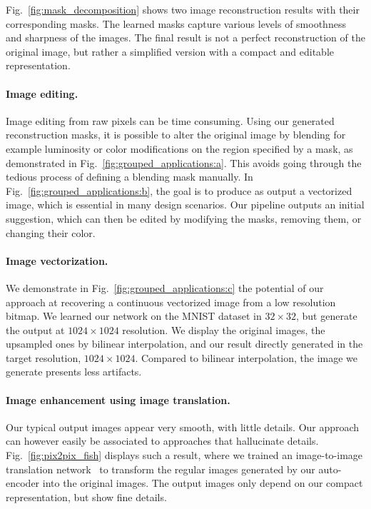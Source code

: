 \documentclass[10pt,twocolumn,letterpaper]{article}
\begin{document}
Fig.~\ref{fig:mask_decomposition} shows two image reconstruction results with their corresponding masks. The learned masks capture various levels of smoothness and sharpness of the images. The final result is not a perfect reconstruction of the original image, but rather a simplified version with a compact and editable representation.

\paragraph{Image editing.}{
Image editing from raw pixels can be time consuming. Using our generated reconstruction masks, it is possible to alter the original image by blending for example luminosity or color modifications on the region specified by a mask, as demonstrated in Fig.~\ref{fig:grouped_applications:a}. This avoids going through the tedious process of defining a blending mask manually.
In Fig.~\ref{fig:grouped_applications:b}, the goal is to produce as output a vectorized image, which is essential in many design scenarios. Our pipeline outputs an initial suggestion, which can then be edited by modifying the masks, removing them, or changing their color.
}

\paragraph{Image vectorization.}

We demonstrate in Fig.~\ref{fig:grouped_applications:c} the potential of our approach at recovering a continuous vectorized image from a low resolution bitmap. We learned our network on the MNIST dataset in $32\times32$, but generate the output at $1024\times1024$ resolution. We display the original images, the upsampled ones by bilinear interpolation, and our result directly generated in the target resolution, $1024\times1024$. Compared to bilinear interpolation, the image we generate presents less artifacts.



\paragraph{Image enhancement using image translation.}

Our typical output images appear very smooth, with little details. Our approach can however easily be associated to approaches that hallucinate details. Fig.~\ref{fig:pix2pix_fish} displays such a result, where we trained an image-to-image translation network~\cite{Isola2016ImageToImage} to transform the regular images generated by our auto-encoder into the original images. The output images only depend on our compact representation, but show fine details.
\end{document}
